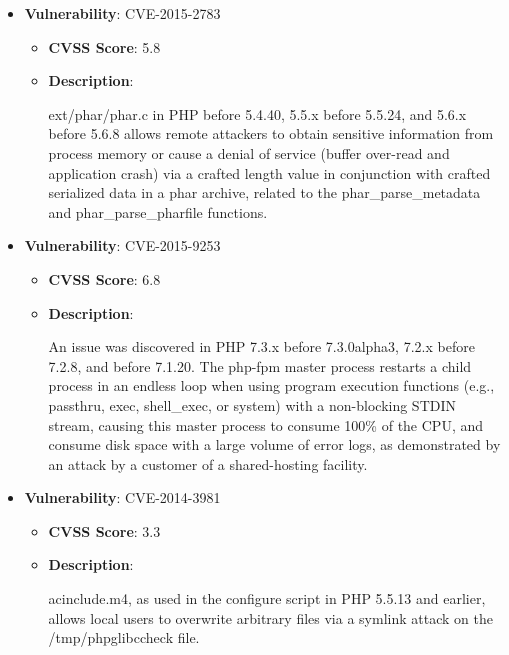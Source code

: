 \documentclass{article}
\begin{document}
\begin{itemize}
        \item \textbf{Vulnerability}: CVE-2015-2783
        \begin{itemize}
            \item \textbf{CVSS Score}:  5.8 
            \item \textbf{Description}:
            \parbox[t]{0.9\linewidth}{
                \ttfamily ext/phar/phar.c in PHP before 5.4.40, 5.5.x before 5.5.24, and 5.6.x before 5.6.8 allows remote attackers to obtain sensitive information from process memory or cause a denial of service (buffer over-read and application crash) via a crafted length value in conjunction with crafted serialized data in a phar archive, related to the phar\_parse\_metadata and phar\_parse\_pharfile functions.
            }
        \end{itemize}
    
        \item \textbf{Vulnerability}: CVE-2015-9253
        \begin{itemize}
            \item \textbf{CVSS Score}:  6.8 
            \item \textbf{Description}:
            \parbox[t]{0.9\linewidth}{
                \ttfamily An issue was discovered in PHP 7.3.x before 7.3.0alpha3, 7.2.x before 7.2.8, and before 7.1.20. The php-fpm master process restarts a child process in an endless loop when using program execution functions (e.g., passthru, exec, shell\_exec, or system) with a non-blocking STDIN stream, causing this master process to consume 100\% of the CPU, and consume disk space with a large volume of error logs, as demonstrated by an attack by a customer of a shared-hosting facility.
            }
        \end{itemize}
    
        \item \textbf{Vulnerability}: CVE-2014-3981
        \begin{itemize}
            \item \textbf{CVSS Score}:  3.3 
            \item \textbf{Description}:
            \parbox[t]{0.9\linewidth}{
                \ttfamily acinclude.m4, as used in the configure script in PHP 5.5.13 and earlier, allows local users to overwrite arbitrary files via a symlink attack on the /tmp/phpglibccheck file.
            }
        \end{itemize}
    

\end{itemize}
\end{document}
